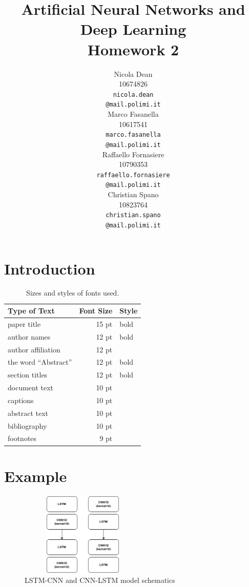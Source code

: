 \documentclass[11pt]{article}
\title{Artificial Neural Networks and Deep Learning \\
Homework 2}
\author{
  Nicola Dean \\
  10674826 \\
  {\tt nicola.dean \\
  \tt @mail.polimi.it} \\\And
  Marco Fasanella \\
  10617541 \\
  {\tt marco.fasanella \\
  \tt @mail.polimi.it} \\\And
  Raffaello Fornasiere \\
    10790353 \\
    {\tt raffaello.fornasiere \\
    \tt @mail.polimi.it} \\\And
  Christian Spano \\
  10823764 \\
  {\tt christian.spano \\
  \tt @mail.polimi.it} \\}
\date{}
\begin{document}
\maketitle


\section{Introduction}


\begin{table}[h]
\begin{center}
\begin{tabular}{|l|rl|}
\hline \bf Type of Text & \bf Font Size & \bf Style \\ \hline
paper title & 15 pt & bold \\
author names & 12 pt & bold \\
author affiliation & 12 pt & \\
the word ``Abstract'' & 12 pt & bold \\
section titles & 12 pt & bold \\
document text & 10 pt  &\\
captions & 10 pt & \\
abstract text & 10 pt & \\
bibliography & 10 pt & \\
footnotes & 9 pt & \\
\hline
\end{tabular}
\end{center}
\caption{\label{fontsizes} Sizes and styles of fonts used.}
\end{table}

\section{Example}

\begin{center}
\begin{figure}[h]
\includegraphics[width=6cm, height=4cm]{LSTMCNN}
\caption{LSTM-CNN and CNN-LSTM model schematics}
\end{figure}
\end{center}
\end{document}
